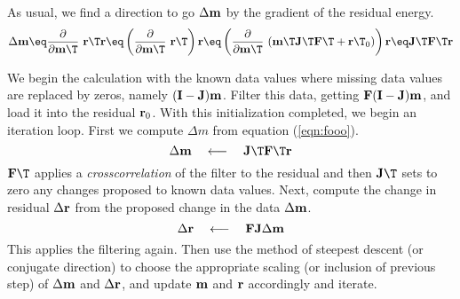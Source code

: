 As usual, we find a direction to go $\Delta \bold m$
by the gradient of the residual energy.
\begin{equation}
\Delta\bold m
\eq \frac{\partial }{\partial \bold m\T}\ \bold r\T\bold r
\eq \left( \frac{\partial }{\partial \bold m\T} \ \bold r\T \right) \bold r
\eq \left( \frac{\partial }{\partial \bold m\T} \
(\bold m\T\bold J\T\bold F\T + \bold r\T_0)                 \right) \bold r
\eq  \bold J\T \bold F\T \bold r
\label{eqn:fooo}
\end{equation}

\par
We begin the calculation with
the known data values where missing data values are replaced by zeros, namely
$(\bold I-\bold J)\bold m$.
Filter this data,
getting $\bold F(\bold I-\bold J)\bold m$,
and load it into the residual $\bold r_0$.
With this initialization completed,
we begin an iteration loop.
First we compute $\Delta m$ from equation (\ref{eqn:fooo}).
\begin{equation}
\Delta\bold m \quad\longleftarrow\quad \bold J\T \bold F\T \bold r
\end{equation}
$\bold F\T$ applies a {\it crosscorrelation} of the filter to the residual
and then $\bold J\T$ sets to zero any changes proposed to known data values.
Next, compute the change in residual $\Delta\bold r$
from the proposed change in the data $\Delta\bold m$.
\begin{equation}
\Delta\bold r \quad \longleftarrow \quad \bold F \bold J \Delta \bold m
\label{eqn:lastmistheory}
\end{equation}
This applies the filtering again.
Then use the method of steepest descent (or conjugate direction)
to choose the appropriate scaling (or inclusion of previous step)
of $\Delta \bold m$ and $\Delta \bold r$,
and update $\bold m$ and $\bold r$ accordingly
and iterate.

